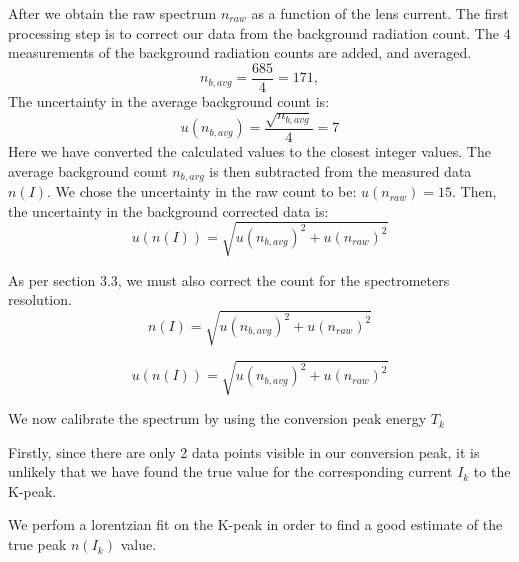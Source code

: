 \documentclass[10pt, a4paper]{article}
\begin{document}
\begin{multicols}{2}
After we obtain the raw spectrum $n_{raw}$ as a function of the lens current. The first processing step is to correct our data from the background radiation count.
The 4 measurements of the background radiation counts are added, and averaged. 
\begin{equation} n_{b,avg} = \frac{685}{4} = 171,
\end{equation}
The uncertainty in the average background count is:
\begin{equation} u(n_{b,avg}) = \frac{\sqrt{n_{b,avg}}}{4} = 7
\end{equation}
Here we have converted the calculated values to the closest integer values.
The average background count $n_{b,avg}$ is then subtracted from the measured data $n(I)$. We chose the uncertainty in the raw count to be: $u(n_{raw}) = 15$.
Then, the uncertainty in the background corrected data is:
\begin{equation} u(n(I)) = \sqrt{u(n_{b,avg})^2 + u(n_{raw})^2}
\end{equation}

As per section 3.3, we must also correct the count for the spectrometers resolution.
\begin{equation} n(I) = \sqrt{u(n_{b,avg})^2 + u(n_{raw})^2}
\end{equation}

\begin{equation} u(n(I)) = \sqrt{u(n_{b,avg})^2 + u(n_{raw})^2}
\end{equation}





We now calibrate the spectrum by using the conversion peak energy $T_k$

Firstly, since there are only 2 data points visible in our conversion peak, it is unlikely that we have found the true value for the corresponding current $I_k$ to the K-peak.

We perfom a lorentzian fit on the K-peak in order to find a good estimate of the true peak $n(I_k)$ value.



\end{multicols}
\end{document}
